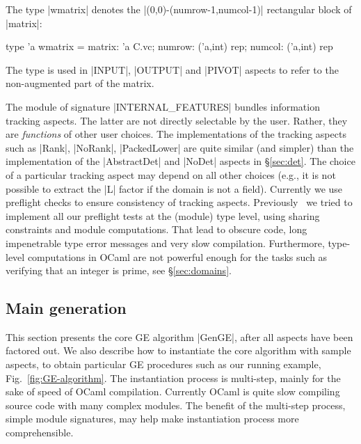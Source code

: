 \documentclass{elsart}
\begin{document}
The type |wmatrix| denotes the |(0,0)-(numrow-1,numcol-1)|
rectangular block of |matrix|:
\begin{code}
type 'a wmatrix = {matrix: 'a C.vc; numrow: ('a,int) rep; 
                   numcol: ('a,int) rep}
\end{code}
The type is used in |INPUT|, |OUTPUT| and |PIVOT| aspects to refer to
the non-augmented part of the matrix.


The module of signature |INTERNAL_FEATURES| bundles information
tracking aspects. The latter are not directly selectable by the
user. Rather, they are \emph{functions} of other user choices. The
implementations of the tracking aspects such as |Rank|, |NoRank|,
|PackedLower| are quite similar (and simpler) than the implementation
of the |AbstractDet| and |NoDet| aspects in \S\ref{sec:det}. The
choice of a particular tracking aspect may depend on all other choices
(e.g., it is not possible to extract the |L| factor if the domain is
not a field). Currently we use preflight checks to ensure consistency
of tracking aspects. Previously~\cite{CaretteKiselyov05} we tried to
implement all our preflight tests at the (module) type level, using
sharing constraints and module computations. That lead to obscure
code, long impenetrable type error messages and very slow compilation.
Furthermore, type-level computations in OCaml are not
powerful enough for the tasks such as verifying that an
integer is prime, see \S\ref{sec:domains}.


\subsection{Main generation}\label{sec:main-generation}

This section presents the core GE algorithm |GenGE|, after all aspects
have been factored out. We also describe how to instantiate the core
algorithm with sample aspects, to obtain particular GE procedures such
as our running example, Fig.~\ref{fig:GE-algorithm}. The instantiation
process is multi-step, mainly for the sake of speed of OCaml
compilation. Currently OCaml is quite slow compiling source code with
many complex modules. The benefit of the multi-step process, simple
module signatures, may help make instantiation process more
comprehensible.
\end{document}
